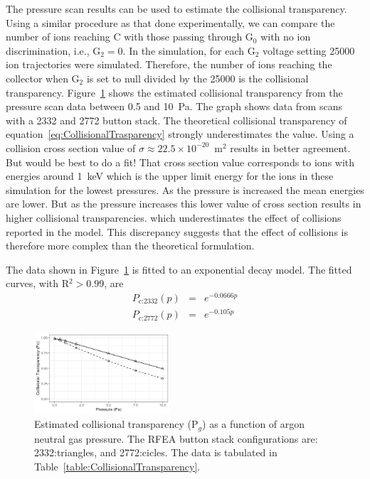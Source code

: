 The pressure scan results can be used to estimate the collisional transparency. Using a similar procedure as that done experimentally, we can compare the number of ions reaching C with those passing through G$_0$ with no ion discrimination, i.e., G$_2 =0$. In the simulation, for each G$_2$ voltage setting 25000 ion trajectories were simulated. Therefore, the number of ions reaching the collector when G$_2$ is set to null divided by the 25000 is the collisional transparency. Figure~\ref{fig:CollisionalTransparency} shows the estimated collisional transparency from the pressure scan data between 0.5 and 10~Pa. The graph shows data from scans with a 2332 and 2772 button stack. The theoretical collisional transparency of equation~\ref{eq:CollisionalTrasparency} strongly underestimates the value. Using a collision cross section value of $\sigma \approx 22.5 \times 10^{-20}$~m$^2$ results in better agreement. But would be best to do a fit! That cross section value corresponds to ions with energies around 1~keV which is the upper limit energy for the ions in these simulation for the lowest pressures. As the pressure is increased the mean energies are lower. But as the pressure increases this lower value of cross section results in higher collisional transparencies. which underestimates the effect of collisions reported in the model. This discrepancy suggests that the effect of collisions is therefore more complex than the theoretical formulation.  

The data shown in Figure~\ref{fig:CollisionalTransparency} is fitted to an exponential decay model. The fitted curves, with R$^2 > 0.99$, are
\begin{eqnarray}
P_\text{c:2332} (p) &=& e^{-0.0666 p} \\
P_\text{c:2772} (p) &=& e^{-0.105 p} 
\end{eqnarray}    

\begin{figure}[htbp]
\centering
\includegraphics[width=0.45\textwidth]{Figures/CollisionalTransparency.jpeg}
\caption{Estimated collisional transparency (P$_g$) as a function of argon neutral gas pressure. The RFEA button stack configurations are: 2332:triangles, and 2772:cicles. The data is tabulated in Table~\ref{table:CollisionalTransparency}.}
\label{fig:CollisionalTransparency}
\end{figure}


